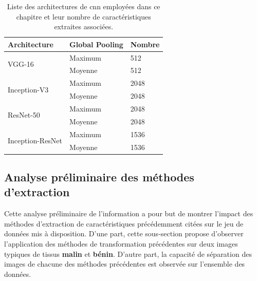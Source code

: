 \begin{table}[H]
    \centering
    \begin{tabular}{lll}
    \toprule
    \textbf{Architecture}               & Global Pooling   & \textbf{Nombre}    \\ \hline
    \multirow{2}{*}{VGG-16}             & Maximum          & 512                \\ \cline{2-3}
                                        & Moyenne          & 512                \\ \hline
    \multirow{2}{*}{Inception-V3}       & Maximum          & 2048               \\ \cline{2-3}
                                        & Moyenne          & 2048               \\ \hline
    \multirow{2}{*}{ResNet-50}          & Maximum          & 2048               \\ \cline{2-3}
                                        & Moyenne          & 2048               \\ \hline
    \multirow{2}{*}{Inception-ResNet}   & Maximum          & 1536               \\ \cline{2-3}
                                        & Moyenne          & 1536               \\
    \bottomrule
    \end{tabular}
    \caption{Liste des architectures de \gls{cnn} employées dans ce chapitre et leur nombre de caractéristiques extraites associées.}
    \label{tab:number_features_transferlearning}
\end{table}\par
\clearpage

\subsection{Analyse préliminaire des méthodes d'extraction}
Cette analyse préliminaire de l'information a pour but de montrer l'impact des méthodes d'extraction de caractéristiques précédemment citées sur le jeu de données mis à disposition. D'une part, cette sous-section propose d'observer l'application des méthodes de transformation précédentes sur deux images typiques de tissus \textbf{malin} et \textbf{bénin}. D'autre part, la capacité de séparation des images de chacune des méthodes précédentes est observée sur l'ensemble des données.\par

